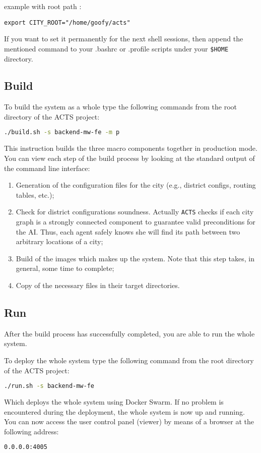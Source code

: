 example with root path :
\begin{lstlisting}
export CITY_ROOT="/home/goofy/acts"
\end{lstlisting}

If you want to set it permanently for the next shell sessions,
then append the mentioned command
to your .bashrc or .profile scripts under your
\texttt{\$HOME} directory.

\subsection{Build}\label{sec:sys-build}

To build the system as a whole type the following commands from the root
directory of the ACTS project:

\begin{lstlisting}[language=bash]
./build.sh -s backend-mw-fe -m p
\end{lstlisting}

This instruction builds the three macro components together in production mode.
You can view each step of the build process by looking at the standard output
of the command line interface:

\begin{enumerate}
\item Generation of the configuration files for the city (e.g., district
  configs, routing tables, etc.);
\item Check for district configurations soundness. Actually \texttt{ACTS}
  checks if each city graph is a strongly connected component to guarantee
  valid preconditions for the AI. Thus, each agent safely knows she will
  find its path between two arbitrary locations of a city;
\item Build of the images which makes up the system. Note that this step
  takes, in general, some time to complete;
\item Copy of the necessary files in their target directories.
\end{enumerate}

\subsection{Run}\label{sec:sys-run}

After the build process has successfully completed, you are able to
run the whole system.

To deploy the whole system type the following command from the root directory
of the ACTS project:

\begin{lstlisting}[language=bash]
./run.sh -s backend-mw-fe
\end{lstlisting}

Which deploys the whole system using Docker Swarm.
If no problem is encountered during the deployment, the whole system is now up
and running.
You can now access the user control panel (viewer) by means of a browser at the
following address:

\begin{lstlisting}[language=bash]
0.0.0.0:4005
\end{lstlisting}
